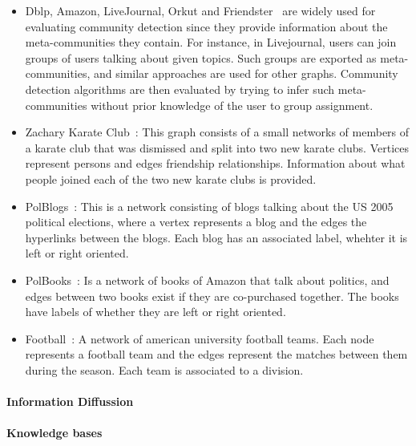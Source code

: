 \begin{itemize}
  \item Dblp, Amazon, LiveJournal, Orkut and Friendster~\cite{yang2015defining}
    are widely used for evaluating community detection since they provide
    information about the meta-communities they contain. For instance, in
    Livejournal, users can join groups of users talking about given topics. Such
    groups are exported as meta-communities, and similar approaches are used for
    other graphs. Community detection algorithms are then evaluated by trying to
    infer such meta-communities without prior knowledge of the user to group
    assignment.
  \item Zachary Karate Club~\cite{zachary1977information}: This graph consists
    of a small networks of members of a karate club that was dismissed and split
    into two new karate clubs. Vertices represent persons and edges friendship
    relationships. Information about what people joined each of the two new
    karate clubs is provided.
  \item PolBlogs~\cite{adamic2005political}: This is a network consisting of
    blogs talking about the US 2005 political elections, where a vertex
    represents a blog and the edges the hyperlinks between the blogs. Each blog
    has an associated label, whehter it is left or right oriented.
  \item PolBooks~\cite{10dimacs}: Is a network of books of Amazon that talk
    about politics, and edges between two books exist if they are co-purchased
    together. The books have labels of whether they are left or right oriented.
  \item Football~\cite{girvan2002network}: A network of american university
    football teams. Each node represents a football team and the edges represent
    the matches between them during the season. Each team is associated to a
    division.
\end{itemize}

\paragraph{Information Diffussion}

 \paragraph{Knowledge bases}

